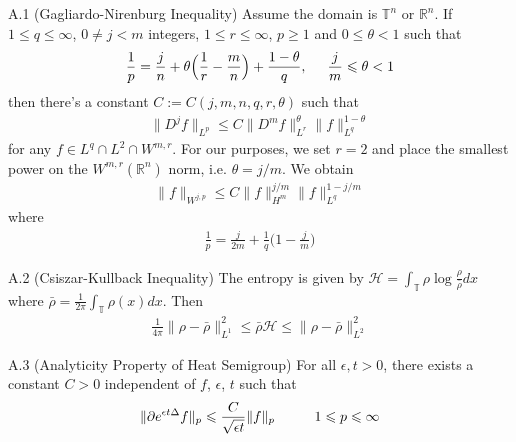 \documentclass[11pt,letterpaper]{amsart}
\theoremstyle{plain}
\theoremstyle{definition}
\theoremstyle{remark}
\newcommand{\R}{\ensuremath{\mathbb{R}}}   %
\newcommand{\T}{\ensuremath{\mathbb{T}}}   %
\def \cH {\mathcal{H}}
\renewcommand{\geq}{\geqslant}
\renewcommand{\leq}{\leqslant}
\def\R{\mathbb{R}}
\def\T{\mathbb{T}}
\begin{document}
\begin{customlemma}{A.1} (Gagliardo-Nirenburg Inequality)
    \label{lma:GN_inequality}
    Assume the domain is $\T^n$ or $\R^n$. If $1 \leq q \leq \infty$, $0 \neq j < m$ integers, $1 \leq r \leq \infty$, $p \geq 1$ and 
    $0 \leq \theta < 1$ such that 
    \begin{align*}
        \frac{1}{p} = \frac{j}{n} + \theta \Big(\frac{1}{r} - \frac{m}{n} \Big) + \frac{1-\theta}{q}, \hspace{5mm} \frac{j}{m} \leq \theta < 1
    \end{align*}
    then there's a constant $C := C(j,m,n,q,r,\theta)$ such that 
    \begin{align*}
        \|D^j f\|_{L^p} \leq C \|D^m f\|_{L^r}^{\theta} \|f\|_{L^{q}}^{1-\theta} 
    \end{align*}
    for any $f \in L^q \cap L^2 \cap W^{m,r}$.
    For our purposes, we set $r = 2$ and place the smallest power on the $W^{m,r}(\R^n)$ norm, i.e. $\theta = j/m$. 
    We obtain 
    \begin{align*}
        \|f\|_{W^{j,p}} \leq C \|f\|_{H^m}^{j/m} \|f\|_{L^q}^{1-j/m}
    \end{align*}
    where 
    \begin{align*}
        \frac{1}{p} = \frac{j}{2m} + \frac{1}{q} \Big(1 - \frac{j}{m} \Big)
    \end{align*}   
\end{customlemma}



\begin{customlemma}{A.2} (Csiszar-Kullback Inequality)  
    \label{lma:ck_inequality}
    The entropy is given by $\cH = \int_{\T} \rho \log \frac{\rho}{\bar{\rho}} dx$ where $\bar{\rho} = \frac{1}{2\pi} \int_{\T} \rho(x)dx$. 
    Then
    \begin{align*}
        \frac{1}{4\pi} \|\rho - \bar{\rho}\|_{L^1}^2 \leq \bar{\rho} \cH \leq \|\rho - \bar{\rho}\|_{L^2}^2
    \end{align*}
\end{customlemma}


\begin{customlemma}{A.3} (Analyticity Property of Heat Semigroup)
    For all $\epsilon, t > 0$, there exists a constant $C > 0$ independent of $f$, $\epsilon$, $t$ such that 
    \begin{align*} 
        \|\partial e^{\epsilon t \Delta} f \|_p \leq \frac{C}{\sqrt{\epsilon t}} \|f\|_p  \hspace{10mm} 1 \leq p \leq \infty
    \end{align*}
\end{customlemma}
\end{document}
